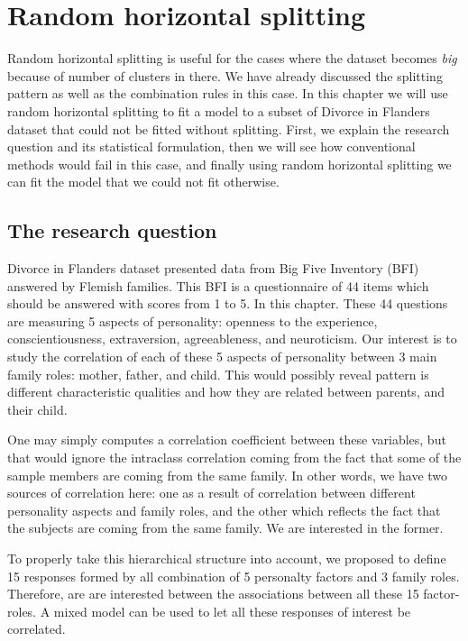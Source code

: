 \documentclass[11pt,a5paper,twoside]{book}
\begin{document}




\chapter{Random horizontal splitting}

Random horizontal splitting is useful for the cases where the dataset becomes \emph{big} because of number of clusters in there. We have already discussed the splitting pattern as well as the combination rules in this case. In this chapter we will use random horizontal splitting to fit a model to a subset of Divorce in Flanders dataset that could not be fitted without splitting. First, we explain the research question and its statistical formulation, then we will see how conventional methods would fail in this case, and finally using random horizontal splitting we can fit the model that we could not fit otherwise.

\section{The research question}

Divorce in Flanders dataset presented data from Big Five Inventory (BFI) answered by Flemish families. This BFI is a questionnaire of 44 items which should be answered with scores from 1 to 5. In this chapter. These 44 questions are measuring 5 aspects of personality: openness to the experience, conscientiousness, extraversion, agreeableness, and neuroticism.  Our interest is to study the correlation of each of these 5 aspects of personality between 3 main family roles: mother, father, and child. This would possibly reveal pattern is different characteristic qualities and how they are related between parents, and their child.


One may simply computes a correlation coefficient between these variables, but that would ignore the intraclass correlation coming from the fact that some of the sample members are coming from the same family. In other words, we have two sources of correlation here: one as a result of correlation between different personality aspects and family roles, and the other which reflects the fact that the subjects are coming from the same family. We are interested in the former. 

To properly take this hierarchical structure into account, we proposed to define 15 responses formed by all combination of 5 personalty factors and 3 family roles. Therefore, are are interested between the associations between all these 15 factor-roles. A mixed model can be used to let all these responses of interest be correlated.
\end{document}
